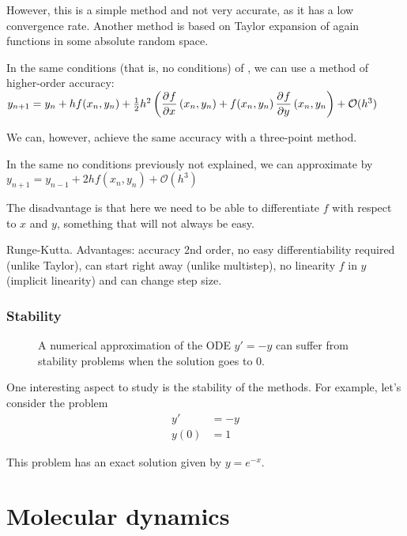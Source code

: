 \documentclass[palatino]{epflnotes}
\begin{document}
However, this is a simple method and not very accurate, as it has a low convergence rate. Another method is based on Taylor expansion of again functions in some absolute random space.

\begin{prop} In the same conditions (that is, no conditions) of , we can use a method of higher-order accuracy: \( y_{n+1} = y_n + hf(x_n, y_n) + \frac{1}{2}h^2 \left(\dpd{f}{x}(x_n, y_n) + f (x_n, y_n) \dpd{f}{y}(x_n, y_n\right) + \mathcal{O}(h^3) \label{eq:TaylorExpansion} \)
\end{prop}

We can, however, achieve the same accuracy with a three-point method.

\begin{prop} In the same no conditions previously not explained, we can approximate by \( y_{n+1} = y_{n-1} + 2hf(x_n, y_n) + \mathcal{O}(h^3)\)
\end{prop}

The disadvantage is that here we need to be able to differentiate $f$ with respect to $x$ and $y$, something that will not always be easy.

Runge-Kutta. Advantages: accuracy 2nd order,  no easy differentiability required (unlike Taylor), can start right away (unlike multistep), no linearity $f$ in $y$ (implicit linearity)
 and can change step size.

\subsection{Stability}

\begin{figure}[hbtp]
\caption{A numerical approximation of the ODE $y' = -y$ can suffer from stability problems when the solution goes to 0.}
\label{fig:ExponentialApproxProblem}
\end{figure}

One interesting aspect to study is the stability of the methods. For example, let's consider the problem \begin{align*} y' &= -y \\ y(0) &= 1 \end{align*}

This problem has an exact solution given by $y = e^{-x}$.

\chapter{Molecular dynamics}
\end{document}
